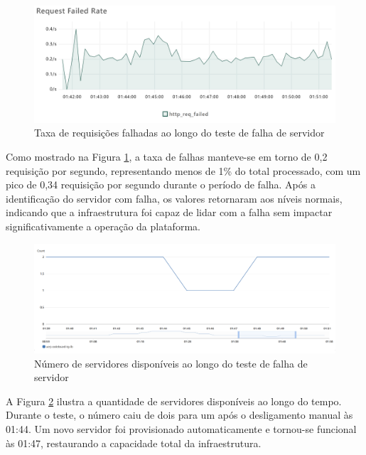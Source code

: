 \begin{figure}[H]
    \centering
    \includegraphics[width=1\textwidth]{assets/server-failing-test/req-failed-rate.png}
    \caption{Taxa de requisições falhadas ao longo do teste de falha de servidor}
    \label{fig:server-failing-req-failed-rate}
\end{figure}

Como mostrado na Figura \ref{fig:server-failing-req-failed-rate}, a taxa de falhas manteve-se em torno de 0,2 requisição por segundo, representando menos de 1\% do total processado, com um pico de 0,34 requisição por segundo durante o período de falha. Após a 
identificação do servidor com falha, os valores retornaram aos níveis normais, indicando que a infraestrutura foi capaz de lidar com a falha sem impactar significativamente a operação da plataforma.

\begin{figure}[H]
    \centering
    \includegraphics[width=1\textwidth]{assets/server-failing-test/healthy-hosts.png}
    \caption{Número de servidores disponíveis ao longo do teste de falha de servidor}
    \label{fig:server-failing-healthy-hosts}
\end{figure}

A Figura \ref{fig:server-failing-healthy-hosts} ilustra a quantidade de servidores disponíveis ao longo do tempo. Durante o teste, o número caiu de dois para um após o desligamento manual às 01:44. Um novo servidor foi provisionado automaticamente e tornou-se funcional às 01:47, restaurando a capacidade total da infraestrutura.


